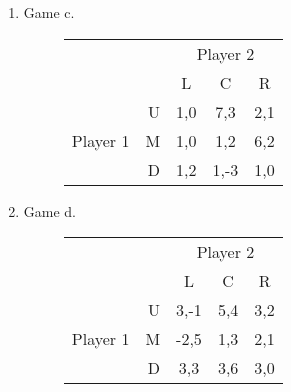 \begin{enumerate}
\begin{enumerate}






    \item Game c.
    \begin{figure}[p]
    \begin{center}
    \begin{tabular}{crccc}
    & & \multicolumn{3}{c}{Player 2} \\ [.15cm]
    & & L & C & R \\ \cline{3-5}
    \multirow{3}{1.5cm}{Player 1}
    & U & \multicolumn{1}{|c|}{1,0} & \multicolumn{1}{c}{7,3} & \multicolumn{1}{|c|}{2,1} \\ \cline{3-5}
    & M & \multicolumn{1}{|c|}{1,0} & \multicolumn{1}{c}{1,2} & \multicolumn{1}{|c|}{6,2} \\ \cline{3-5}
    & D & \multicolumn{1}{|c|}{1,2} & \multicolumn{1}{c}{1,-3} & \multicolumn{1}{|c|}{1,0} \\ \cline{3-5}
    \end{tabular}
    \end{center}
    \end{figure}






    \item Game d.

    \begin{figure}[p]
    \begin{center}
    \begin{tabular}{crccc}
    & & \multicolumn{3}{c}{Player 2} \\ [.15cm]
    & & L & C & R \\ \cline{3-5}
    \multirow{3}{1.5cm}{Player 1}
    & U & \multicolumn{1}{|c|}{3,-1} & \multicolumn{1}{c}{5,4} & \multicolumn{1}{|c|}{3,2} \\ \cline{3-5}
    & M & \multicolumn{1}{|c|}{-2,5} & \multicolumn{1}{c}{1,3} & \multicolumn{1}{|c|}{2,1} \\ \cline{3-5}
    & D & \multicolumn{1}{|c|}{3,3} & \multicolumn{1}{c}{3,6} & \multicolumn{1}{|c|}{3,0} \\ \cline{3-5}
    \end{tabular}
    \end{center}
    \end{figure}


\end{enumerate}
\end{enumerate}
